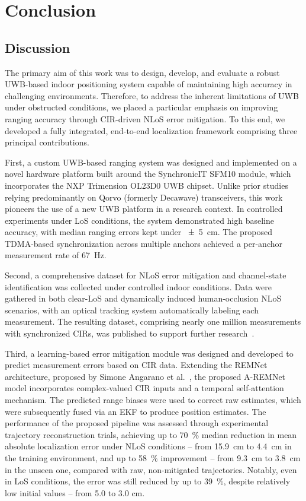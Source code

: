 \chapter{Conclusion}

\section{Discussion}
The primary aim of this work was to design, develop, and evaluate a robust UWB-based indoor positioning system capable of maintaining high accuracy in challenging environments. Therefore, to address the inherent limitations of UWB under obstructed conditions, we placed a particular emphasis on improving ranging accuracy through CIR-driven NLoS error mitigation. To this end, we developed a fully integrated, end-to-end localization framework comprising three principal contributions.

First, a custom UWB-based ranging system was designed and implemented on a novel hardware platform built around the SynchronicIT SFM10 module, which incorporates the NXP Trimension OL23D0 UWB chipset. Unlike prior studies relying predominantly on Qorvo (formerly Decawave) transceivers, this work pioneers the use of a new UWB platform in a research context. In controlled experiments under LoS conditions, the system demonstrated high baseline accuracy, with median ranging errors kept under \SI{\pm 5}{\centi\metre}. The proposed TDMA-based synchronization across multiple anchors achieved a per-anchor measurement rate of \SI{67}{\hertz}.

Second, a comprehensive dataset for NLoS error mitigation and channel-state identification was collected under controlled indoor conditions. Data were gathered in both clear-LoS and dynamically induced human-occlusion NLoS scenarios, with an optical tracking system automatically labeling each measurement. The resulting dataset, comprising nearly one million measurements with synchronized CIRs, was published to support further research~\cite{yaroshevych_2025_rangecir}.

Third, a learning-based error mitigation module was designed and developed to predict measurement errors based on CIR data. Extending the REMNet architecture, proposed by Simone Angarano et al.~\cite{Simone2021UWB}, the proposed A-REMNet model incorporates complex-valued CIR inputs and a temporal self-attention mechanism. The predicted range biases were used to correct raw estimates, which were subsequently fused via an EKF to produce position estimates. The performance of the proposed pipeline was assessed through experimental trajectory reconstruction trials, achieving up to \SI{70}{\percent} median reduction in mean absolute localization error under NLoS conditions -- from \SI{15.9}{\centi\metre} to \SI{4.4}{\centi\metre} in the training environment, and up to \SI{58}{\percent} improvement -- from \SI{9.3}{\centi\metre} to \SI{3.8}{\centi\metre} in the unseen one, compared with raw, non-mitigated trajectories. Notably, even in LoS conditions, the error was still reduced by up to \SI{39}{\percent}, despite relatively low initial values -- from 5.0 to 3.0 cm.

